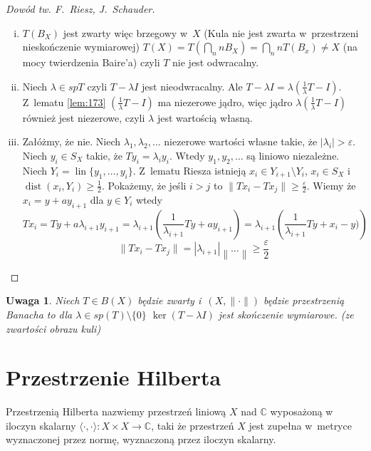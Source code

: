 \documentclass[11pt]{mwrep}
\renewcommand{\[}{\begin{equation}}
\renewcommand{\]}{\end{equation}}
\newcommand{\C}{{\ensuremath{\mathbb C}}}
\newcommand{\lin}{\operatorname{lin}}
\newcommand{\dist}{\operatorname{dist}}
\newcommand{\norm}{\|\cdot\|}
\newcommand{\spac}[1][X]{$(#1,\norm)$ }
\newtheorem{uwaga}[subsection]{Uwaga}
\newcounter{numer}
\begin{document}
\begin{proof}[Dowód tw. F.~Riesz, J.~Schauder]
	\begin{enumerate}[(i)]
			\item $T(B_X)$ jest zwarty więc brzegowy w~$X$ (Kula nie jest zwarta w~przestrzeni nieskończenie wymiarowej)
				$T(X) = T\left( \bigcap_n nB_X \right) = \bigcap_n n T(B_x) \not=X$ (na mocy twierdzenia Baire'a) czyli $T$ nie jest odwracalny.
			\item Niech $\lambda \in spT$ czyli $T-\lambda I$ jest nieodwracalny. 
				Ale $T-\lambda I = \lambda\left(\frac{1}{\lambda}T - I\right)$.
				Z~lematu \ref{lem:173} $\left( \frac{1}{\lambda}T - I \right)$ ma niezerowe jądro,
				więc jądro $\lambda\left( \frac{1}{\lambda}T - I \right)$ również jest niezerowe, czyli $\lambda$ jest wartością własną.
			\item Załóżmy, że nie. Niech $\lambda_1, \lambda_2,\ldots$ niezerowe wartości własne takie, że $|\lambda_i|>\varepsilon$.
				Niech $y_i \in S_X$ takie, że $Ty_i = \lambda_i y_i$. Wtedy $y_1, y_2,\ldots$ są liniowo niezależne.
				Niech $Y_i = \lin \{y_1,\ldots,y_i\}$.
				Z~lematu Riesza istnieją $x_i \in Y_{i+1} \setminus Y_{i}$, $x_i \in S_X$ i~$\dist(x_i, Y_i) \ge \frac{1}{2}$.
				Pokażemy, że jeśli $i>j$ to $\|T x_i - Tx_j\|\ge \frac{\varepsilon}{2}$.
				Wiemy że $x_i = y+ a y_{i+1}$ dla $y\in Y_i$ wtedy 
				$$Tx_i = Ty + a \lambda_{i+1} y_{i+1} =
				\lambda_{i+1}\left( \frac{1}{\lambda_{i+1}}Ty +a y_{i+1} \right) = 
				\lambda_{i+1}\left( \frac{1}{\lambda_{i+1}}Ty +x_i -y) \right)$$
				$$\|Tx_i - Tx_j\| = |\lambda_{i+1}|\left\| \texttt{\ldots} \right\| \ge \frac{\varepsilon}{2}$$
		\end{enumerate}
\end{proof}
\begin{uwaga}
	Niech $T\in B(X)$ będzie zwarty i~\spac będzie przestrzenią Banacha to dla $\lambda \in sp(T) \setminus \{0\}$ 
	$\ker (T - \lambda I)$ jest skończenie wymiarowe. (ze zwartości obrazu kuli)
\end{uwaga}
\chapter{Przestrzenie Hilberta}
Przestrzenią Hilberta nazwiemy przestrzeń liniową $X$ nad $\C$ wyposażoną w iloczyn skalarny 
$\langle \cdot,\cdot \rangle \colon X \times X \to \C$,
taki że przestrzeń $X$ jest zupełna w~metryce wyznaczonej przez normę, wyznaczoną przez iloczyn skalarny.
\end{document}
